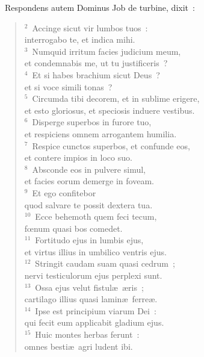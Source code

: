 ~\lettrine[lines=10,image=true,loversize=0.05,lraise=-0.03]{R}{}espondens autem Dominus Job de turbine, dixit~:
\begin{flushleft}\begin{verse}\vspace{6pt}${}^{2}$~Accinge sicut vir lumbos tuos~:\\ interrogabo te, et indica mihi.\\
${}^{3}$~Numquid irritum facies judicium meum,\\ et condemnabis me, ut tu justificeris~?\\
${}^{4}$~Et si habes brachium sicut Deus~?\\ et si voce simili tonas~?\\
${}^{5}$~Circumda tibi decorem, et in sublime erigere,\\ et esto gloriosus, et speciosis induere vestibus.\\
${}^{6}$~Disperge superbos in furore tuo,\\ et respiciens omnem arrogantem humilia.\\
${}^{7}$~Respice cunctos superbos, et confunde eos,\\ et contere impios in loco suo.\\
${}^{8}$~Absconde eos in pulvere simul,\\ et facies eorum demerge in foveam.\\
${}^{9}$~Et ego confitebor\\ quod salvare te possit dextera tua.\\
${}^{10}$~Ecce behemoth quem feci tecum,\\ fœnum quasi bos comedet.\\
${}^{11}$~Fortitudo ejus in lumbis ejus,\\ et virtus illius in umbilico ventris ejus.\\
${}^{12}$~Stringit caudam suam quasi cedrum~;\\ nervi testiculorum ejus perplexi sunt.\\
${}^{13}$~Ossa ejus velut fistul\ae\ \ae ris~;\\ cartilago illius quasi lamin\ae\ ferre\ae .\\
${}^{14}$~Ipse est principium viarum Dei~:\\ qui fecit eum applicabit gladium ejus.\\
${}^{15}$~Huic montes herbas ferunt~:\\ omnes besti\ae\ agri ludent ibi.\\

\end{verse}
\end{flushleft}
